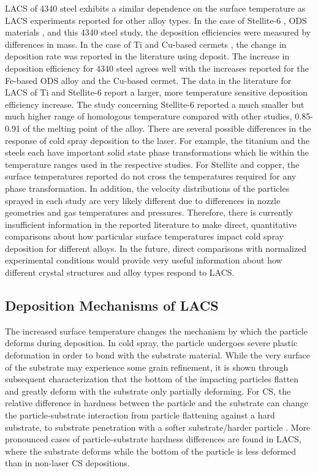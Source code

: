 LACS of 4340 steel exhibits a similar dependence on the surface temperature as LACS experiments reported for other alloy types. In the case of Stellite-6 \cite{RN135}, ODS materials \cite{RN383}, and this 4340 steel study, the deposition efficiencies were measured by differences in mass.  In the case of Ti \cite{RN173} and Cu-based cermets \cite{RN3366}, the change in deposition rate was reported in the literature using deposit. The increase in deposition efficiency for 4340 steel agrees well with the increases reported for the Fe-based ODS alloy and the Cu-based cermet. The data in the literature for LACS of Ti and Stellite-6 report a larger, more temperature sensitive deposition efficiency increase. The study concerning Stellite-6 reported a much smaller but much higher range of homologous temperature compared with other studies, 0.85-0.91 of the melting point of the alloy. There are several possible differences in the response of cold spray deposition to the laser. For example, the titanium and the steels each have important solid state phase transformations which lie within the temperature ranges used in the respective studies. For Stellite and copper, the surface temperatures reported do not cross the temperatures required for any phase transformation. In addition, the velocity distributions of the particles sprayed in each study are very likely different due to differences in nozzle geometries and gas temperatures and pressures. Therefore, there is currently insufficient information in the reported literature to make direct, quantitative comparisons about how particular surface temperatures impact cold spray deposition for different alloys.  In the future, direct comparisons with normalized experimental conditions would provide very useful information about how different crystal structures and alloy types respond to LACS. 


\subsection*{Deposition Mechanisms of LACS}
\label{Deposition Mechanisms of LACS}

The increased surface temperature changes the mechanism by which the particle deforms during deposition. In cold spray, the particle undergoes severe plastic deformation in order to bond with the substrate material. While the very surface of the substrate may experience some grain refinement, it is shown through subsequent characterization that the bottom of the impacting particles flatten and greatly deform with the substrate only partially deforming. For CS, the relative difference in hardness between the particle and the substrate can change the particle-substrate interaction from particle flattening against a hard substrate, to substrate penetration with a softer substrate/harder particle \cite{RN3383}. More pronounced cases of particle-substrate hardness differences are found in LACS, where the substrate deforms while the bottom of the particle is less deformed than in non-laser CS depositions. 


